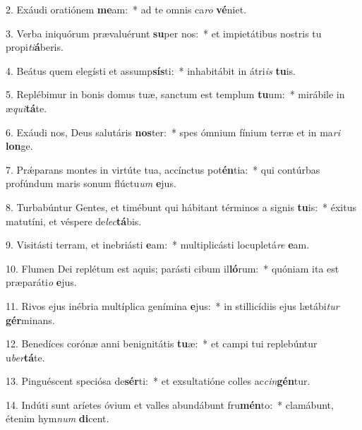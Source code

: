 2. Exáudi oratiónem \textbf{me}am:~*  ad te omnis ca\textit{ro} \textbf{vé}niet.\

3. Verba iniquórum prævaluérunt \textbf{su}per nos:~*  et impietátibus nostris tu propi\textit{ti}\textbf{á}beris.\

4. Beátus quem elegísti et assump\textbf{sís}ti:~*  inhabitábit in átri\textit{is} \textbf{tu}is.\

5. Replébimur in bonis domus tuæ, sanctum est templum \textbf{tu}um:~*  mirábile in æ\textit{qui}\textbf{tá}te.\

6. Exáudi nos, Deus salutáris \textbf{nos}ter:~*  spes ómnium fínium terræ et in ma\textit{ri} \textbf{lon}ge.\

7. Prǽparans montes in virtúte tua, accínctus pot\textbf{én}tia:~*  qui contúrbas profúndum maris sonum flúctu\textit{um} \textbf{e}jus.\

8. Turbabúntur Gentes, et timébunt qui hábitant términos a signis \textbf{tu}is:~*  éxitus matutíni, et véspere de\textit{lec}\textbf{tá}bis.\

9. Visitásti terram, et inebriásti \textbf{e}am:~*  multiplicásti locupletá\textit{re} \textbf{e}am.\

10. Flumen Dei replétum est aquis; parásti cibum il\textbf{ló}rum:~*  quóniam ita est præparáti\textit{o} \textbf{e}jus.\

11. Rivos ejus inébria multíplica genímina \textbf{e}jus:~*  in stillicídiis ejus lætábi\textit{tur} \textbf{gér}minans.\

12. Benedíces corónæ anni benignitátis \textbf{tu}æ:~*  et campi tui replebúntur u\textit{ber}\textbf{tá}te.\

13. Pinguéscent speciósa de\textbf{sér}ti:~*  et exsultatióne colles ac\textit{cin}\textbf{gén}tur.\

14. Indúti sunt aríetes óvium et valles abundábunt fru\textbf{mén}to:~*  clamábunt, étenim hym\textit{num} \textbf{di}cent.\

